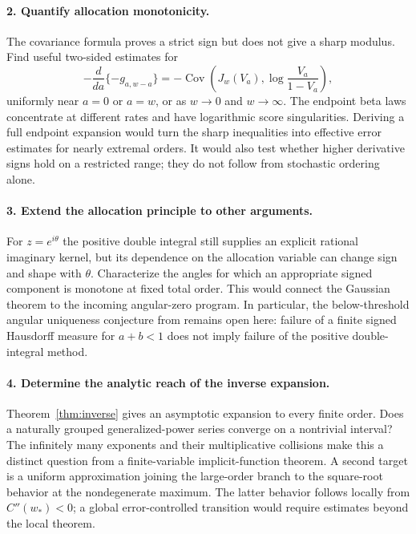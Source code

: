 \paragraph{2. Quantify allocation monotonicity.}
The covariance formula proves a strict sign but does not give a sharp
modulus. Find useful two-sided estimates for
\[
 -\frac{d}{da}\{-g_{a,w-a}\}
 =-\operatorname{Cov}\!\left(J_w(V_a),
                          \log\frac{V_a}{1-V_a}\right),
\]
uniformly near $a=0$ or $a=w$, or as $w\to0$ and $w\to\infty$.
The endpoint beta laws concentrate at different rates and have
logarithmic score singularities. Deriving a full endpoint expansion
would turn the sharp inequalities into effective error estimates for
nearly extremal orders. It would also test whether higher derivative
signs hold on a restricted range; they do not follow from stochastic
ordering alone.

\paragraph{3. Extend the allocation principle to other arguments.}
For $z=e^{i\theta}$ the positive double integral still supplies an
explicit rational imaginary kernel, but its dependence on the
allocation variable can change sign and shape with $\theta$.
Characterize the angles for which an appropriate signed component is
monotone at fixed total order. This would connect the Gaussian theorem
to the incoming angular-zero program. In particular, the
below-threshold angular uniqueness conjecture from \cite{realorder}
remains open here: failure of a finite signed Hausdorff measure for
$a+b<1$ does not imply failure of the positive double-integral method.

\paragraph{4. Determine the analytic reach of the inverse expansion.}
Theorem~\ref{thm:inverse} gives an asymptotic expansion to every finite
order. Does a naturally grouped generalized-power series converge on a
nontrivial interval? The infinitely many exponents and their
multiplicative collisions make this a distinct question from a
finite-variable implicit-function theorem. A second target is a
uniform approximation joining the large-order branch to the
square-root behavior at the nondegenerate maximum. The latter behavior
follows locally from $C''(w_*)<0$; a global error-controlled transition
would require estimates beyond the local theorem.

